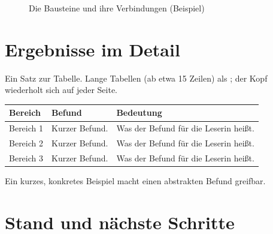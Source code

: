 \documentclass[11pt,a4paper]{scrartcl}
\begin{document}
\begin{figure}[htbp]
\centering
{}
\caption{Die Bausteine und ihre Verbindungen (Beispiel)}\label{fig:aufbau}
\end{figure}

\section{Ergebnisse im Detail}\label{sec:ergebnisse}

Ein Satz zur Tabelle. Lange Tabellen (ab etwa 15 Zeilen) als
; der Kopf wiederholt sich auf jeder Seite.

{\small
\begin{longtable}{@{}>{\raggedright}p{3.0cm}>{\raggedright}p{4.4cm}>{\raggedright\arraybackslash}p{7.6cm}@{}}
\toprule
\textbf{Bereich} & \textbf{Befund} & \textbf{Bedeutung} \\
\midrule
\endhead
\bottomrule
\endlastfoot
Bereich 1 & Kurzer Befund. & Was der Befund für die Leserin heißt. \\
Bereich 2 & Kurzer Befund. & Was der Befund für die Leserin heißt. \\
Bereich 3 & Kurzer Befund. & Was der Befund für die Leserin heißt. \\
\end{longtable}
}

\begin{beispiel}
Ein kurzes, konkretes Beispiel macht einen abstrakten Befund greifbar.
\end{beispiel}

\section{Stand und nächste Schritte}\label{sec:stand}
\end{document}
